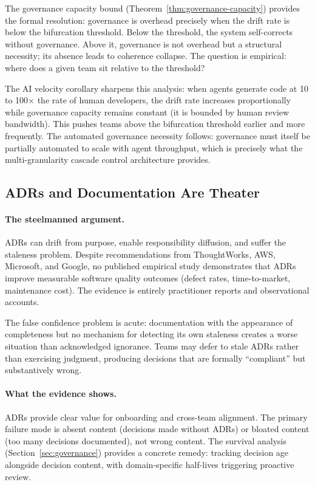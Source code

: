 \documentclass[11pt, a4paper, logo, copyright]{googledeepmind}
\begin{document}
The governance capacity bound (Theorem~\ref{thm:governance-capacity}) provides the formal
resolution: governance is overhead precisely when the drift rate is below the
bifurcation threshold.  Below the threshold, the system self-corrects without
governance.  Above it, governance is not overhead but a structural necessity;
its absence leads to coherence collapse.  The question is empirical: where does
a given team sit relative to the threshold?

The AI velocity corollary sharpens this analysis: when agents generate code at
10 to 100$\times$ the rate of human developers, the drift rate increases
proportionally while governance capacity remains constant (it is bounded by
human review bandwidth).  This pushes teams above the bifurcation threshold
earlier and more frequently.  The automated governance necessity follows:
governance must itself be partially automated to scale with agent throughput,
which is precisely what the multi-granularity cascade control architecture
provides.


\subsection{ADRs and Documentation Are Theater}
\label{sec:contrarian-adrs}

\paragraph{The steelmanned argument.}
ADRs can drift from purpose, enable responsibility diffusion, and suffer the staleness problem. Despite recommendations from ThoughtWorks, AWS, Microsoft, and Google, no published empirical study demonstrates that ADRs improve measurable software quality outcomes (defect rates, time-to-market, maintenance cost). The evidence is entirely practitioner reports and observational accounts.

The false confidence problem is acute: documentation with the appearance of completeness but no mechanism for detecting its own staleness creates a worse situation than acknowledged ignorance. Teams may defer to stale ADRs rather than exercising judgment, producing decisions that are formally ``compliant'' but substantively wrong.

\paragraph{What the evidence shows.}
ADRs provide clear value for onboarding and cross-team alignment. The primary failure mode is absent content (decisions made without ADRs) or bloated content (too many decisions documented), not wrong content. The survival analysis (Section~\ref{sec:governance}) provides a concrete remedy: tracking decision age alongside decision content, with domain-specific half-lives triggering proactive review.
\end{document}

